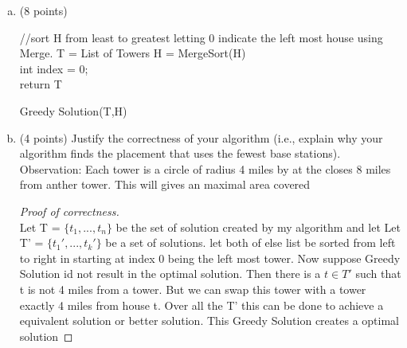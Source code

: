 \documentclass[12pt]{amsart}
\begin{document}
\begin{enumerate}[(a)]
\item (8 points)

 \begin{algorithm}
\SetAlgoLined
//sort H from least to greatest letting 0 indicate the left most house using Merge.
T = List of Towers 
H = MergeSort(H)\\
int index = 0;\\
return T


 \caption{Greedy Solution(T,H)}
\end{algorithm}

\newpage


\item (4 points)
Justify the correctness of your algorithm (i.e., explain why your algorithm finds the placement that uses the fewest base stations).\\


Observation: Each tower is a circle of radius 4 miles by at the closes 8 miles from anther tower. This will gives an maximal area covered 

\begin{proof}[Proof of correctness]\;\\


Let T = $\{t_1,...,t_n\}$ be the set of solution created by my algorithm and let Let T' = $\{t_1',...,t_k'\}$ be a set of solutions. let both of else list be sorted from left to right in  starting at index  0 being the left most tower. Now suppose Greedy Solution id not result in the optimal solution. Then there is a $t \in T'$ such that t is not 4 miles from a tower. But we can swap this tower with a tower exactly 4 miles from house t. Over all the T' this can be done to achieve a equivalent solution or better solution. This Greedy Solution creates a optimal solution 
	
\end{proof}
\vfill



\end{enumerate}
\end{document}
